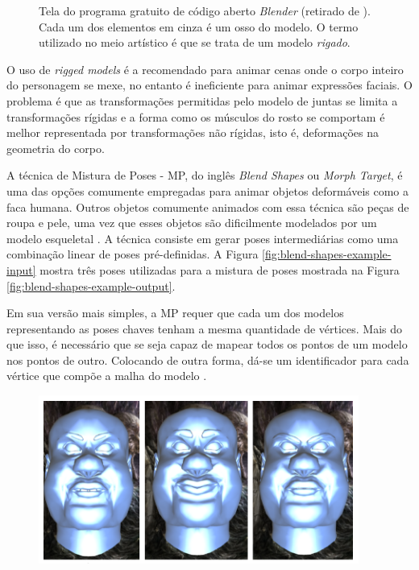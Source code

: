 {\begin{figure}[!htb]
  \caption{ Tela do programa gratuito de código aberto \textit{Blender} (retirado de \cite{rigs-tutorial}). Cada um dos elementos em cinza é um osso do modelo. O termo utilizado no meio artístico é que se trata de um modelo \textit{rigado}.}

\label{fig:rigged-models} 
\end{figure}
    
    O uso de \textit{rigged models} é a recomendado para animar cenas onde o corpo inteiro do personagem se mexe, no entanto é ineficiente para animar expressões faciais. O problema é que as transformações permitidas pelo modelo de juntas se limita a transformações rígidas e a forma como os músculos do rosto se comportam é melhor representada por transformações não rígidas, isto é, deformações na geometria do corpo.
    
    A técnica de  Mistura de Poses - MP, do inglês \textit{Blend Shapes} ou \textit{Morph Target}, é uma das opções comumente empregadas para animar objetos deformáveis como a faca humana. Outros objetos comumente animados com essa técnica são peças de roupa e pele, uma vez que esses objetos são dificilmente modelados por um modelo esqueletal \cite{master-thesis-on-blend-shapes}. A técnica consiste em gerar poses intermediárias como uma combinação linear de poses pré-definidas. A Figura \ref{fig:blend-shapes-example-input} mostra três poses utilizadas para a mistura de poses mostrada na Figura \ref{fig:blend-shapes-example-output}.
    
    Em sua versão mais simples, a MP requer que cada um dos modelos representando as poses chaves tenham a mesma quantidade de vértices. Mais do que isso, é necessário que se seja capaz de mapear todos os pontos de um modelo nos pontos de outro. Colocando de outra forma, dá-se um identificador para cada vértice que compõe a malha do modelo \cite{tutorial-supremo-on-blend-shapes}.    
    
\FloatBarrier
\begin{figure}[!htb]
   \centering
  \includegraphics[width=0.7\linewidth]{./figs/inputToBlendShapes.png}


\end{figure}}
